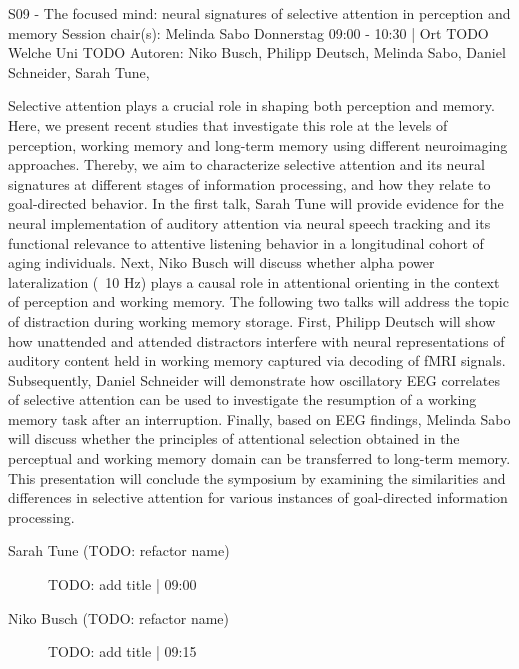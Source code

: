 
            \begin{symposium}
            {S09 - The focused mind: neural signatures of selective attention in perception and memory}
            {Session chair(s): Melinda Sabo }
            {Donnerstag 09:00 - 10:30 | Ort TODO}
            {Welche Uni TODO}
            Autoren: Niko Busch, Philipp Deutsch, Melinda Sabo, Daniel Schneider, Sarah Tune, 

Selective attention plays a crucial role in shaping both perception and memory. Here, we present recent studies that investigate this role at the levels of perception, working memory and long-term memory using different neuroimaging approaches. Thereby, we aim to characterize selective attention and its neural signatures at different stages of information processing, and how they relate to goal-directed behavior. In the first talk, Sarah Tune will provide evidence for the neural implementation of auditory attention via neural speech tracking and its functional relevance to attentive listening behavior in a longitudinal cohort of aging individuals. Next, Niko Busch will discuss whether alpha power lateralization (~10 Hz) plays a causal role in attentional orienting in the context of perception and working memory. The following two talks will address the topic of distraction during working memory storage. First, Philipp Deutsch will show how unattended and attended distractors interfere with neural representations of auditory content held in working memory captured via decoding of fMRI signals. Subsequently, Daniel Schneider will demonstrate how oscillatory EEG correlates of selective attention can be used to investigate the resumption of a working memory task after an interruption. Finally, based on EEG findings, Melinda Sabo will discuss whether the principles of attentional selection obtained in the perceptual and working memory domain can be transferred to long-term memory. This presentation will conclude the symposium by examining the similarities and differences in selective attention for various instances of goal-directed information processing.
            \begin{description}    
            
                \item [Sarah Tune (TODO: refactor name)] TODO: add title \textcolor{mygray}{ | 09:00}    
                
                \item [Niko Busch (TODO: refactor name)] TODO: add title \textcolor{mygray}{ | 09:15}    
                

\end{description}
\end{symposium}
